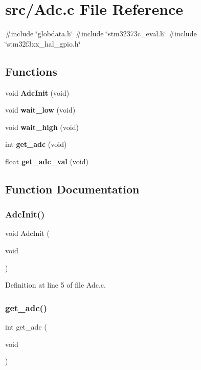 \section{src/\+Adc.c File Reference}
\label{_adc_8c}
{\ttfamily \#include \char`\"{}globdata.\+h\char`\"{}}\newline
{\ttfamily \#include \char`\"{}stm32373c\+\_\+eval.\+h\char`\"{}}\newline
{\ttfamily \#include \char`\"{}stm32f3xx\+\_\+hal\+\_\+gpio.\+h\char`\"{}}\newline
\subsection*{Functions}
\begin{DoxyCompactItemize}
\item 
void \textbf{ Adc\+Init} (void)
\item 
void \textbf{ wait\+\_\+low} (void)
\item 
void \textbf{ wait\+\_\+high} (void)
\item 
int \textbf{ get\+\_\+adc} (void)
\item 
float \textbf{ get\+\_\+adc\+\_\+val} (void)
\end{DoxyCompactItemize}


\subsection{Function Documentation}
\mbox{\label{_adc_8c_a5ac508fc2087ee41c1458b98f0f4e475}} 
\subsubsection{Adc\+Init()}
{\footnotesize\ttfamily void Adc\+Init (\begin{DoxyParamCaption}\item[{void}]{ }\end{DoxyParamCaption})}



Definition at line 5 of file Adc.\+c.

\mbox{\label{_adc_8c_ac24b7a006ec04345dc568bc52cde31d2}} 
\subsubsection{get\+\_\+adc()}
{\footnotesize\ttfamily int get\+\_\+adc (\begin{DoxyParamCaption}\item[{void}]{ }\end{DoxyParamCaption})}



